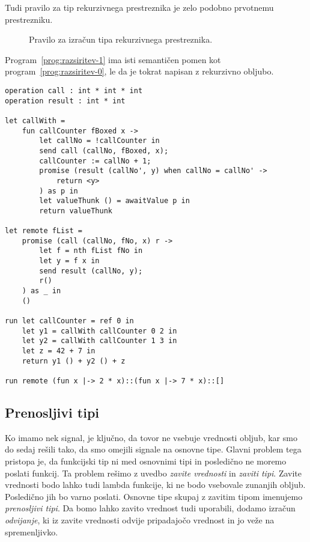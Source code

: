 Tudi pravilo za tip rekurzivnega prestreznika je zelo podobno prvotnemu prestrezniku.

\begin{figure}[H]
	\centering
	\small
	\begin{mathpar}
	\end{mathpar}
	
	\caption{Pravilo za izračun tipa rekurzivnega prestreznika.}
	\label{fig:tipi-pravila-rekurzivni-prestreznik}
\end{figure} 

Program~\ref{prog:razsiritev-1} ima isti semantičen pomen kot program~\ref{prog:razsiritev-0}, le da je tokrat napisan z rekurzivno obljubo.

\begin{lstlisting}[caption={Primer z rekurzivnim prestreznikom},label={prog:razsiritev-1},float,floatplacement=h]
operation call : int * int * int
operation result : int * int

let callWith =
	fun callCounter fBoxed x ->
		let callNo = !callCounter in
		send call (callNo, fBoxed, x);
		callCounter := callNo + 1;
		promise (result (callNo', y) when callNo = callNo' ->
			return <y>
		) as p in
		let valueThunk () = awaitValue p in
		return valueThunk

let remote fList =
	promise (call (callNo, fNo, x) r ->
		let f = nth fList fNo in
		let y = f x in
		send result (callNo, y);
		r()
	) as _ in
	()

run	let callCounter = ref 0 in
	let y1 = callWith callCounter 0 2 in
	let y2 = callWith callCounter 1 3 in
	let z = 42 + 7 in
	return y1 () + y2 () + z

run remote (fun x |-> 2 * x)::(fun x |-> 7 * x)::[]
\end{lstlisting}



\subsection{Prenosljivi tipi}

Ko imamo nek signal, je ključno, da tovor ne vsebuje vrednosti obljub, kar smo do sedaj rešili tako, da smo omejili signale na osnovne tipe. Glavni problem tega pristopa je, da funkcijski tip ni med osnovnimi tipi in posledično ne moremo poslati funkcij. Ta problem rešimo z uvedbo \emph{zavite vrednosti} in \emph{zaviti tipi}. Zavite vrednosti bodo lahko tudi lambda funkcije, ki ne bodo vsebovale zunanjih obljub. Posledično jih bo varno poslati. Osnovne tipe skupaj z zavitim tipom imenujemo \emph{prenosljivi tipi}. Da bomo lahko zavito vrednost tudi uporabili, dodamo izračun \emph{odvijanje}, ki iz zavite vrednosti odvije pripadajočo vrednost in jo veže na spremenljivko.

